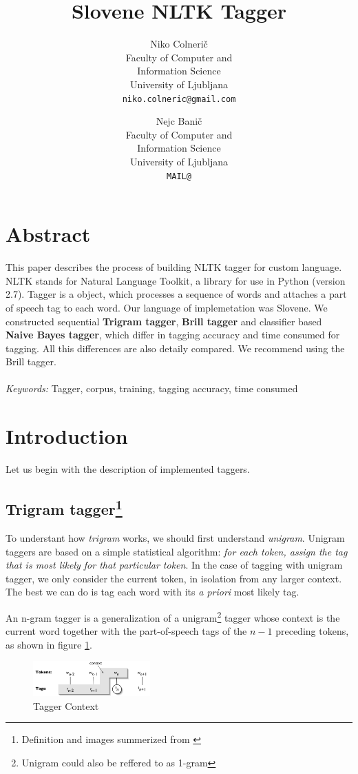 \documentclass[11pt, conference, compsocconf]{IEEEtran}
\title{Slovene NLTK Tagger}
\author{
	Niko Colnerič \\
	\footnotesize Faculty of Computer and \\
	\footnotesize Information Science \\
	\footnotesize University of Ljubljana \\
	\footnotesize \texttt{niko.colneric@gmail.com} \\
	\and
	Nejc Banič \\
	\footnotesize Faculty of Computer and \\
	\footnotesize Information Science \\
	\footnotesize University of Ljubljana \\
	\footnotesize \texttt{MAIL@} \\
}
\begin{document}
\maketitle
\thispagestyle{empty}

\section*{Abstract} %
This paper describes the process of building NLTK tagger for custom language. NLTK stands for Natural Language Toolkit, a library for use in Python (version 2.7).
Tagger is a object, which processes a sequence of words and attaches a part of speech tag to each word.
Our language of implemetation was Slovene.
We constructed sequential \textbf{Trigram tagger}, \textbf{Brill tagger} and classifier based \textbf{Naive Bayes tagger}, which differ in tagging accuracy and time consumed for tagging. All this differences are also detaily compared. We recommend using the Brill tagger.
\\\\
\textit{Keywords:} Tagger, corpus, training, tagging accuracy, time consumed

\section{Introduction} %
Let us begin with the description of implemented taggers.

\subsection[Trigram tagger]{Trigram tagger\footnote{Definition and images summerized from \cite{NLTKBOOK}}}
To understant how \textit{trigram} works, we should first understand \textit{unigram}.
Unigram taggers are based on a simple statistical algorithm: \textit{for each token, assign the tag that is most likely for that particular token}.
In the case of tagging with unigram tagger, we only consider the current token, in isolation from any larger context. The best we can do is tag each word with its \textit{a priori} most likely tag.
\par
An n-gram tagger is a generalization of a unigram\footnote{Unigram could also be reffered to as 1-gram} tagger whose context is the current word together with the part-of-speech tags of the $n-1$ preceding tokens, as shown in figure \ref{fig:trigram}.

\begin{figure}[htb]
\begin{center}
\includegraphics[width=0.4\textwidth]{tag-context.png} 
\end{center}
\caption{Tagger Context}
\label{fig:trigram}
\end{figure}
\end{document}
